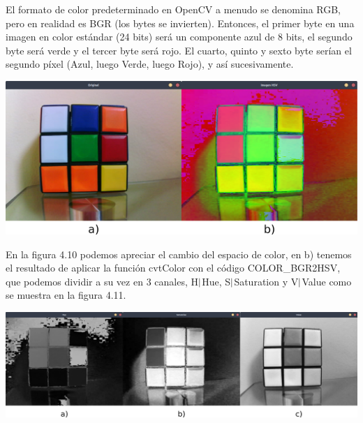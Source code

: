 El formato de color predeterminado en OpenCV a menudo se denomina RGB, pero en realidad
es BGR (los bytes se invierten). Entonces, el primer byte en una imagen en color estándar
(24 bits) será un componente azul de 8 bits, el segundo byte será verde y el tercer
byte será rojo. El cuarto, quinto y sexto byte serían el segundo píxel (Azul, luego
Verde, luego Rojo), y así sucesivamente.
\begin{center}
	\includegraphics[width=0.95 \textwidth]{Contenido/Cuerpo/Capitulo4/Fig2.eps}
	\label{Fig6}
\end{center}
En la figura 4.10 podemos apreciar el cambio del espacio de color, en b) tenemos el resultado de aplicar la función cvtColor
con el código COLOR\_BGR2HSV, que podemos dividir a su vez en 3 canales, H$\arrowvert$Hue, S$\arrowvert$Saturation y
V$\arrowvert$Value como se muestra en la figura 4.11.
\begin{center}
	\includegraphics[width=0.95 \textwidth]{Contenido/Cuerpo/Capitulo4/Fig3.eps}
	\label{Fig6}
\end{center}

